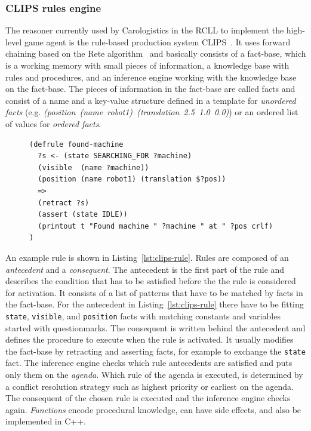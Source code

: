 \documentclass[a4paper,11pt]{article}
\newcommand{\reflst}[1]{Listing~\ref{#1}}
\begin{document}
\subsubsection{CLIPS rules engine} The reasoner currently used by
Carologistics in the RCLL
to implement the high-level game agent is the rule-based production
system CLIPS~\cite{CLIPS-RM}. It uses forward chaining based on the Rete
algorithm~\cite{Rete} and basically consists of a fact-base, which is a
working memory with small pieces of information, a knowledge base
with rules and procedures, and an inference engine
working with the knowledge base on the fact-base. The pieces of
information in the fact-base are called facts and consist of a name
and a key-value structure defined in a template for \emph{unordered
  facts}
(e.g. \textit{(position~(name~robot1)~(translation~2.5~1.0~0.0)}) or
an ordered list of values for \emph{ordered facts}.
\begin{figure}
\begin{lstlisting}[showlines,style=ReallySmallCLIPS, caption={CLIPS
    rule to change a robots state when the object it searched for is visible.},
  label=lst:clips-rule,
  emph={skill, args, state, target, res},
  emphstyle=\bfseries\color{green!80!black},
  emph={[2]\?skill, \$\?args, wait-for-lock, \?target, use,
  WAIT-FOR-LOCK, SKILL-EXECUTION, running},
  emphstyle={[2]\bfseries\color{blue!80!black}},
  morekeywords={retract, assert, modify, skill-call, skill-to-execute,
  wait-for-lock}]
(defrule found-machine
  ?s <- (state SEARCHING_FOR ?machine)
  (visible  (name ?machine))
  (position (name robot1) (translation $?pos))
  =>  
  (retract ?s) 
  (assert (state IDLE))
  (printout t "Found machine " ?machine " at " ?pos crlf)
)
\end{lstlisting} %
\end{figure}
An example rule is shown in \reflst{lst:clips-rule}. Rules are
composed of an \emph{antecedent} and a \emph{consequent}. The
antecedent is the first part of the rule and describes the condition that
has to be satisfied before the the rule is considered for activation.
It consists of a
list of patterns that have to be matched by facts in the fact-base. For the
antecedent in \reflst{lst:clips-rule} there have to be fitting
\texttt{state}, \texttt{visible}, and \texttt{position} facts with
matching constants and variables started with questionmarks.
The consequent is written behind the antecedent and
defines the procedure to execute when the rule is
activated. It usually modifies the fact-base by retracting and
asserting facts, for example to exchange the \texttt{state} fact.
The inference engine checks which rule antecedents are satisfied and
puts only them on the \emph{agenda}.  Which rule of the agenda is
executed, is determined by a conflict resolution strategy such as
highest priority or earliest on the agenda.  The consequent of the
chosen rule is executed and the inference engine checks
again. \emph{Functions} encode procedural knowledge, can have side
effects, and also be implemented in C++.
\end{document}
